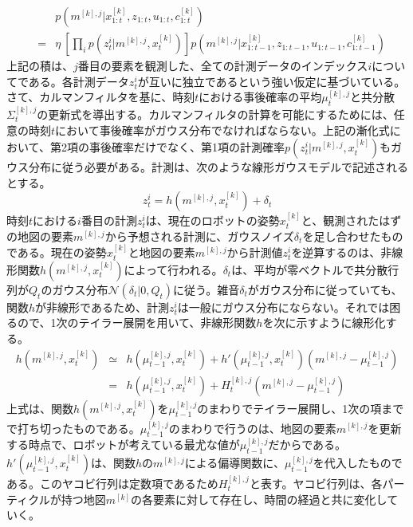 \documentclass[dvipdfmx,a4paper]{jsarticle}
\begin{document}
\begin{eqnarray}
	&& p(m^{[k], j} | x_{1 : t}^{[k]}, z_{1 : t}, u_{1 : t}, c_{1 : t}^{[k]}) \nonumber \\
	&=& \eta \ \left[ \prod_i p(z_t^i | m^{[k], j}, x_t^{[k]}) \right] p(m^{[k], j} | x_{1 : t - 1}^{[k]}, z_{1 : t - 1}, u_{1 : t - 1}, c_{1 : t - 1}^{[k]})
\end{eqnarray}
上記の積は、$j$番目の要素を観測した、全ての計測データのインデックス$i$についてである。各計測データ$z_t^i$が互いに独立であるという強い仮定に基づいている。さて、カルマンフィルタを基に、時刻$t$における事後確率の平均$\mu_t^{[k], j}$と共分散$\Sigma_t^{[k], j}$の更新式を導出する。カルマンフィルタの計算を可能にするためには、任意の時刻$t$において事後確率がガウス分布でなければならない。上記の漸化式において、第2項の事後確率だけでなく、第1項の計測確率$p(z_t^i | m^{[k], j}, x_t^{[k]})$もガウス分布に従う必要がある。計測は、次のような線形ガウスモデルで記述されるとする。
\begin{equation}
	z_t^i = h(m^{[k], j}, x_t^{[k]}) + \delta_t
\end{equation}
時刻$t$における$i$番目の計測$z_t^i$は、現在のロボットの姿勢$x_t^{[k]}$と、観測されたはずの地図の要素$m^{[k], j}$から予想される計測に、ガウスノイズ$\delta_t$を足し合わせたものである。現在の姿勢$x_t^{[k]}$と地図の要素$m^{[k], j}$から計測値$z_t^i$を逆算するのは、非線形関数$h(m^{[k], j}, x_t^{[k]})$によって行われる。$\delta_t$は、平均が零ベクトルで共分散行列が$Q_t$のガウス分布$\mathcal{N}(\delta_t | 0, Q_t)$に従う。雑音$\delta_t$がガウス分布に従っていても、関数$h$が非線形であるため、計測$z_t^i$は一般にガウス分布にならない。それでは困るので、1次のテイラー展開を用いて、非線形関数$h$を次に示すように線形化する。
\begin{eqnarray}
	h(m^{[k], j}, x_t^{[k]}) &\simeq& h(\mu_{t - 1}^{[k], j}, x_t^{[k]}) + h'(\mu_{t - 1}^{[k], j}, x_t^{[k]}) \left( m^{[k], j} - \mu_{t - 1}^{[k], j} \right) \\
	&=& h(\mu_{t - 1}^{[k], j}, x_t^{[k]}) + H_t^{[k], j} \left( m^{[k], j} - \mu_{t - 1}^{[k], j} \right)
\end{eqnarray}
上式は、関数$h(m^{[k], j}, x_t^{[k]})$を$\mu_{t - 1}^{[k], j}$のまわりでテイラー展開し、1次の項までで打ち切ったものである。$\mu_{t - 1}^{[k], j}$のまわりで行うのは、地図の要素$m^{[k], j}$を更新する時点で、ロボットが考えている最尤な値が$\mu_{t - 1}^{[k], j}$だからである。$h'(\mu_{t - 1}^{[k], j}, x_t^{[k]})$は、関数$h$の$m^{[k], j}$による偏導関数に、$\mu_{t - 1}^{[k], j}$を代入したものである。このヤコビ行列は定数項であるため$H_t^{[k], j}$と表す。ヤコビ行列は、各パーティクルが持つ地図$m^{[k]}$の各要素に対して存在し、時間の経過と共に変化していく。
\end{document}
